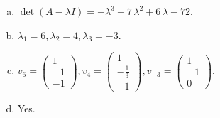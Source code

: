 \begin{questions}
\begin{solution}
\begin{enumerate}[(a)]
\item $\det(A-\lambda I)=-{\lambda}^{3} + 7 \, {\lambda}^{2} + 6 \, {\lambda} - 72$.
\item ${\lambda}_1=6, {\lambda}_2=4, {\lambda}_3=-3$.
\item $v_{6}=\left(\begin{array}{r}
1 \\
-1 \\
-1
\end{array}\right), v_{4}=\left(\begin{array}{r}
1 \\
-\frac{1}{3} \\
-1
\end{array}\right), v_{-3}=\left(\begin{array}{r}
1 \\
-1 \\
0
\end{array}\right)$.
\item Yes.
\end{enumerate}
\end{solution}

\end{questions}

\newpage


\begin{center}
\end{center}

